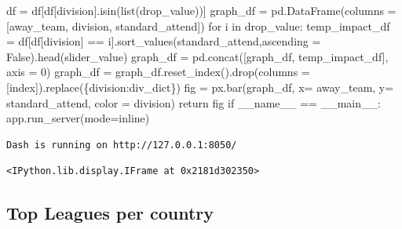 \documentclass[
  letterpaper,
  DIV=11,
  numbers=noendperiod]{scrartcl}
\newenvironment{Shaded}{\begin{snugshade}}{\end{snugshade}}
\newcommand{\BuiltInTok}[1]{\textcolor[rgb]{0.00,0.23,0.31}{#1}}
\newcommand{\ControlFlowTok}[1]{\textcolor[rgb]{0.00,0.23,0.31}{#1}}
\newcommand{\DecValTok}[1]{\textcolor[rgb]{0.68,0.00,0.00}{#1}}
\newcommand{\KeywordTok}[1]{\textcolor[rgb]{0.00,0.23,0.31}{#1}}
\newcommand{\NormalTok}[1]{\textcolor[rgb]{0.00,0.23,0.31}{#1}}
\newcommand{\OperatorTok}[1]{\textcolor[rgb]{0.37,0.37,0.37}{#1}}
\newcommand{\StringTok}[1]{\textcolor[rgb]{0.13,0.47,0.30}{#1}}
\newcommand{\VariableTok}[1]{\textcolor[rgb]{0.07,0.07,0.07}{#1}}
\begin{document}
\begin{Shaded}
\begin{Highlighting}[]
    

\NormalTok{    df }\OperatorTok{=}\NormalTok{ df[df[}\StringTok{\textquotesingle{}division\textquotesingle{}}\NormalTok{].isin(}\BuiltInTok{list}\NormalTok{(drop\_value))]}
\NormalTok{    graph\_df }\OperatorTok{=}\NormalTok{ pd.DataFrame(columns }\OperatorTok{=}\NormalTok{ [}\StringTok{\textquotesingle{}away\_team\textquotesingle{}}\NormalTok{, }\StringTok{\textquotesingle{}division\textquotesingle{}}\NormalTok{, }\StringTok{\textquotesingle{}standard\_attend\textquotesingle{}}\NormalTok{])}
    \ControlFlowTok{for}\NormalTok{ i }\KeywordTok{in}\NormalTok{ drop\_value:}
\NormalTok{        temp\_impact\_df }\OperatorTok{=}\NormalTok{ df[df[}\StringTok{\textquotesingle{}division\textquotesingle{}}\NormalTok{] }\OperatorTok{==}\NormalTok{ i].sort\_values(}\StringTok{\textquotesingle{}standard\_attend\textquotesingle{}}\NormalTok{,ascending }\OperatorTok{=} \VariableTok{False}\NormalTok{).head(slider\_value)}
\NormalTok{        graph\_df }\OperatorTok{=}\NormalTok{ pd.concat([graph\_df, temp\_impact\_df], axis }\OperatorTok{=} \DecValTok{0}\NormalTok{)}
\NormalTok{    graph\_df }\OperatorTok{=}\NormalTok{ graph\_df.reset\_index().drop(columns }\OperatorTok{=}\NormalTok{ [}\StringTok{\textquotesingle{}index\textquotesingle{}}\NormalTok{]).replace(\{}\StringTok{\textquotesingle{}division\textquotesingle{}}\NormalTok{:div\_dict\})}
\NormalTok{    fig }\OperatorTok{=}\NormalTok{ px.bar(graph\_df, x}\OperatorTok{=} \StringTok{\textquotesingle{}away\_team\textquotesingle{}}\NormalTok{, y}\OperatorTok{=} \StringTok{\textquotesingle{}standard\_attend\textquotesingle{}}\NormalTok{, color }\OperatorTok{=} \StringTok{\textquotesingle{}division\textquotesingle{}}\NormalTok{)}
    \ControlFlowTok{return}\NormalTok{ fig}
\ControlFlowTok{if} \VariableTok{\_\_name\_\_} \OperatorTok{==} \StringTok{\textquotesingle{}\_\_main\_\_\textquotesingle{}}\NormalTok{:}
\NormalTok{    app.run\_server(mode}\OperatorTok{=}\StringTok{\textquotesingle{}inline\textquotesingle{}}\NormalTok{)}
\end{Highlighting}
\end{Shaded}

\begin{verbatim}
Dash is running on http://127.0.0.1:8050/
\end{verbatim}

\begin{verbatim}
<IPython.lib.display.IFrame at 0x2181d302350>
\end{verbatim}

\hypertarget{top-leagues-per-country}{%
\subsection{Top Leagues per country}\label{top-leagues-per-country}}
\end{document}
